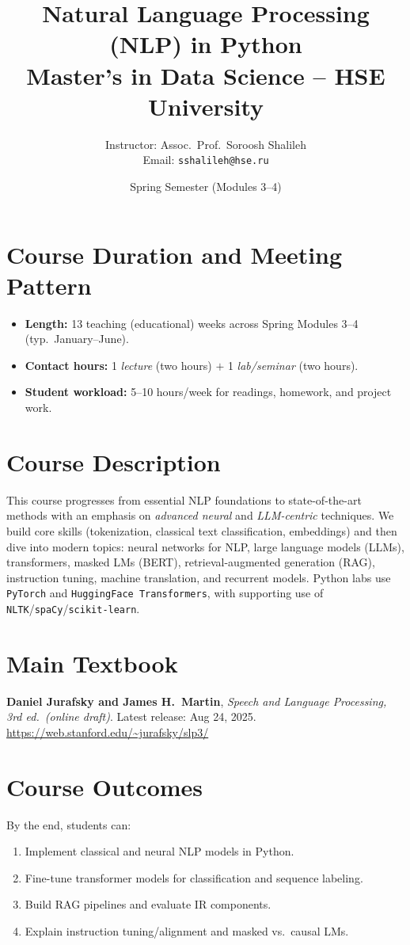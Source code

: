 \documentclass[12pt]{article}
\title{\textbf{Natural Language Processing (NLP) in Python}\\
\large Master’s in Data Science -- HSE University}
\author{Instructor: Assoc.\ Prof.\ Soroosh Shalileh \\
Email: \texttt{sshalileh@hse.ru}}
\date{Spring Semester (Modules 3–4)}
\begin{document}
\maketitle

\section*{Course Duration and Meeting Pattern}
\begin{itemize}[leftmargin=1.25em]
  \item \textbf{Length:} 13 teaching (educational) weeks across Spring Modules 3–4 (typ.\ January--June).
  \item \textbf{Contact hours:} 1 \emph{lecture} (two hours) $+$ 1 \emph{lab/seminar} (two hours).
  \item \textbf{Student workload:} 5--10 hours/week for readings, homework, and project work.
\end{itemize}

\section*{Course Description}
This course progresses from essential NLP foundations to state-of-the-art methods with an emphasis on \emph{advanced neural} and \emph{LLM-centric} techniques. We build core skills (tokenization, classical text classification, embeddings) and then dive into modern topics: neural networks for NLP, large language models (LLMs), transformers, masked LMs (BERT), retrieval-augmented generation (RAG), instruction tuning, machine translation, and recurrent models. Python labs use \texttt{PyTorch} and \texttt{HuggingFace Transformers}, with supporting use of \texttt{NLTK}/\texttt{spaCy}/\texttt{scikit-learn}.

\section*{Main Textbook}
\textbf{Daniel Jurafsky and James H.\ Martin}, \emph{Speech and Language Processing, 3rd ed.\ (online draft)}. Latest release: Aug 24, 2025.\\
\url{https://web.stanford.edu/~jurafsky/slp3/}

\section*{Course Outcomes}
By the end, students can:
\begin{enumerate}[leftmargin=1.25em]
  \item Implement classical and neural NLP models in Python.
  \item Fine-tune transformer models for classification and sequence labeling.
  \item Build RAG pipelines and evaluate IR components.
  \item Explain instruction tuning/align\-ment and masked vs.\ causal LMs.
\end{enumerate}
\end{document}
